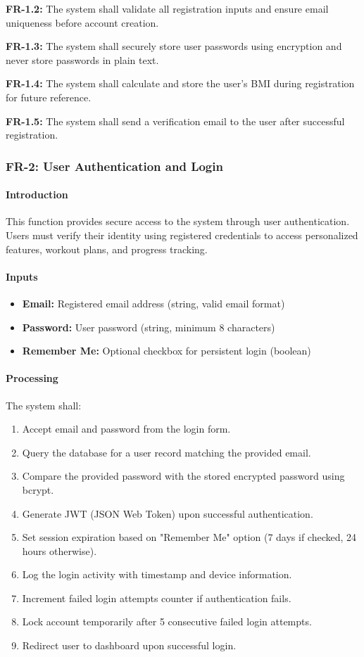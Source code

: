 \documentclass[12pt,a4paper]{article}
\begin{document}
\textbf{FR-1.2:} The system shall validate all registration inputs and ensure email uniqueness before account creation.

\textbf{FR-1.3:} The system shall securely store user passwords using encryption and never store passwords in plain text.

\textbf{FR-1.4:} The system shall calculate and store the user's BMI during registration for future reference.

\textbf{FR-1.5:} The system shall send a verification email to the user after successful registration.

\subsubsection{FR-2: User Authentication and Login}

\paragraph{Introduction}
This function provides secure access to the system through user authentication. Users must verify their identity using registered credentials to access personalized features, workout plans, and progress tracking.

\paragraph{Inputs}
\begin{itemize}
    \item \textbf{Email:} Registered email address (string, valid email format)
    \item \textbf{Password:} User password (string, minimum 8 characters)
    \item \textbf{Remember Me:} Optional checkbox for persistent login (boolean)
\end{itemize}

\paragraph{Processing}
The system shall:
\begin{enumerate}
    \item Accept email and password from the login form.
    \item Query the database for a user record matching the provided email.
    \item Compare the provided password with the stored encrypted password using bcrypt.
    \item Generate JWT (JSON Web Token) upon successful authentication.
    \item Set session expiration based on "Remember Me" option (7 days if checked, 24 hours otherwise).
    \item Log the login activity with timestamp and device information.
    \item Increment failed login attempts counter if authentication fails.
    \item Lock account temporarily after 5 consecutive failed login attempts.
    \item Redirect user to dashboard upon successful login.
\end{enumerate}
\end{document}
